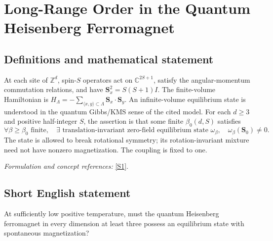 \documentclass[11pt]{article}
\newcommand{\Z}{\mathbb{Z}}
\newcommand{\C}{\mathbb{C}}
\newcommand{\sref}[2]{\hyperlink{source:#1:#2}{[S#2]}}
\newif\ifshowcatalogue
\newcommand{\cataloguescope}[1]{\ifshowcatalogue
	\paragraph{Exact scope in the supplied catalogue.}
	\begin{quote}\small #1\end{quote}\fi}
\begin{document}
\setcounter{section}{0}
	\clearpage
\section*{\texorpdfstring{Long-Range Order in the Quantum Heisenberg Ferromagnet}{Long-Range Order in the Quantum Heisenberg Ferromagnet}}\label{30006979}
	\subsection{Definitions and mathematical statement}
	At each site of $\Z^d$, spin-$S$ operators act on $\C^{2S+1}$, satisfy the angular-momentum commutation relations, and have $\mathbf S_x^2=S(S+1)I$. The finite-volume Hamiltonian is
	$H_\Lambda=-\sum_{\langle x,y\rangle\subset\Lambda}\mathbf S_x\cdot\mathbf S_y$.
	An infinite-volume equilibrium state is understood in the quantum Gibbs/KMS sense of the cited model. For each $d\ge3$ and positive half-integer $S$, the assertion is that some finite $\beta_0(d,S)$ satisfies
	\[
	\forall\beta\ge\beta_0\text{ finite},\quad
	\exists\text{ translation-invariant zero-field equilibrium state }\omega_\beta,
	\quad\omega_\beta(\mathbf S_0)\ne0.
	\]
	The state is allowed to break rotational symmetry; its rotation-invariant mixture need not have nonzero magnetization. The coupling is fixed to one.
	\par\smallskip\textit{Formulation and concept references:} \sref{30006979}{1}.
	\cataloguescope{For the nearest-neighbor isotropic spin-S quantum Heisenberg ferromagnet on Z\textasciicircum{}d with Hamiltonian H=-sum\_\{<x,y>\} S\_x dot S\_y, assert: for every integer d>=3 and every S in\{1/2,1,3/2,...\}, there is a finite beta\_0(d,S)>0 such that for each finite beta>=beta\_0 the infinite-volume zero-field model admits a translation-invariant equilibrium Gibbs state with nonzero spin expectation. Nonzero expectation refers to spontaneous magnetization in a symmetry-breaking state, not the rotation-invariant mixture. Coupling J=1 fixes temperature units; no pointwise-correlation equivalence is asserted.}
	\subsection{Short English statement}
	At sufficiently low positive temperature, must the quantum Heisenberg ferromagnet in every dimension at least three possess an equilibrium state with spontaneous magnetization?
\end{document}
